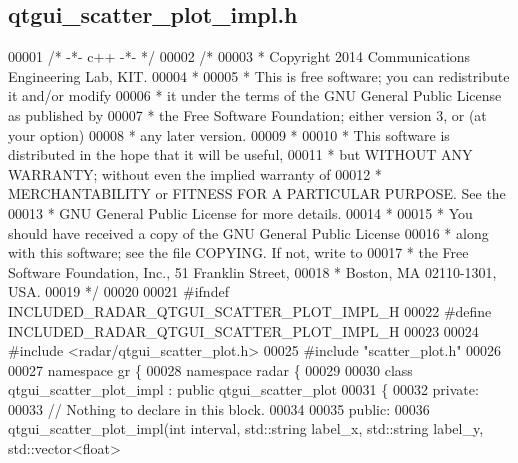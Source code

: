 \subsection{qtgui\+\_\+scatter\+\_\+plot\+\_\+impl.\+h}
\label{qtgui__scatter__plot__impl_8h_source}

\begin{DoxyCode}
00001 \textcolor{comment}{/* -*- c++ -*- */}
00002 \textcolor{comment}{/* }
00003 \textcolor{comment}{ * Copyright 2014 Communications Engineering Lab, KIT.}
00004 \textcolor{comment}{ * }
00005 \textcolor{comment}{ * This is free software; you can redistribute it and/or modify}
00006 \textcolor{comment}{ * it under the terms of the GNU General Public License as published by}
00007 \textcolor{comment}{ * the Free Software Foundation; either version 3, or (at your option)}
00008 \textcolor{comment}{ * any later version.}
00009 \textcolor{comment}{ * }
00010 \textcolor{comment}{ * This software is distributed in the hope that it will be useful,}
00011 \textcolor{comment}{ * but WITHOUT ANY WARRANTY; without even the implied warranty of}
00012 \textcolor{comment}{ * MERCHANTABILITY or FITNESS FOR A PARTICULAR PURPOSE.  See the}
00013 \textcolor{comment}{ * GNU General Public License for more details.}
00014 \textcolor{comment}{ * }
00015 \textcolor{comment}{ * You should have received a copy of the GNU General Public License}
00016 \textcolor{comment}{ * along with this software; see the file COPYING.  If not, write to}
00017 \textcolor{comment}{ * the Free Software Foundation, Inc., 51 Franklin Street,}
00018 \textcolor{comment}{ * Boston, MA 02110-1301, USA.}
00019 \textcolor{comment}{ */}
00020 
00021 \textcolor{preprocessor}{#ifndef INCLUDED\_RADAR\_QTGUI\_SCATTER\_PLOT\_IMPL\_H}
00022 \textcolor{preprocessor}{#define INCLUDED\_RADAR\_QTGUI\_SCATTER\_PLOT\_IMPL\_H}
00023 
00024 \textcolor{preprocessor}{#include <radar/qtgui_scatter_plot.h>}
00025 \textcolor{preprocessor}{#include "scatter_plot.h"}
00026 
00027 \textcolor{keyword}{namespace }gr \{
00028   \textcolor{keyword}{namespace }radar \{
00029 
00030     \textcolor{keyword}{class }qtgui_scatter_plot_impl : \textcolor{keyword}{public} qtgui_scatter_plot
00031     \{
00032      \textcolor{keyword}{private}:
00033       \textcolor{comment}{// Nothing to declare in this block.}
00034 
00035      \textcolor{keyword}{public}:
00036       qtgui_scatter_plot_impl(\textcolor{keywordtype}{int} interval, std::string label\_x, std::string label\_y, std::vector<float> 

\end{DoxyCode}
